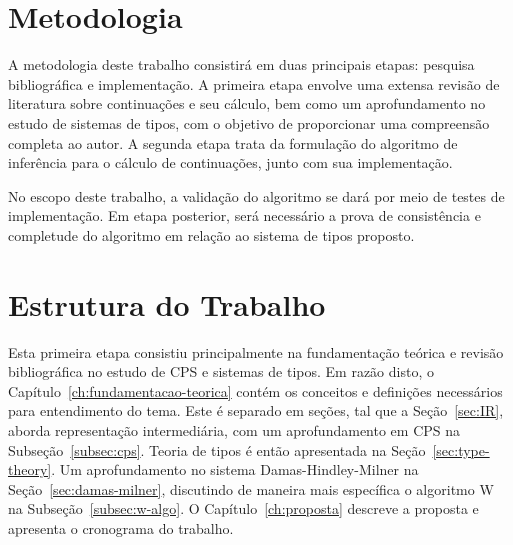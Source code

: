 \section{Metodologia}\label{sec:metodologia}

A metodologia deste trabalho consistirá em duas principais etapas: pesquisa bibliográfica e implementação.
A primeira etapa envolve uma extensa revisão de literatura sobre continuações e seu cálculo, bem como um aprofundamento no estudo de sistemas de tipos, com o objetivo de proporcionar uma compreensão completa ao autor.
A segunda etapa trata da formulação do algoritmo de inferência para o cálculo de continuações, junto com sua implementação.

No escopo deste trabalho, a validação do algoritmo se dará por meio de testes de implementação.
Em etapa posterior, será necessário a prova de consistência e completude do algoritmo em relação ao sistema de tipos proposto.

\section{Estrutura do Trabalho}\label{sec:estrutura-trabalho}

Esta primeira etapa consistiu principalmente na fundamentação teórica e revisão bibliográfica no estudo de CPS e sistemas de tipos.
Em razão disto, o Capítulo~\ref{ch:fundamentacao-teorica} contém os conceitos e definições necessários para entendimento do tema.
Este é separado em seções, tal que a Seção~\ref{sec:IR}, aborda representação intermediária, com um aprofundamento em CPS na Subseção~\ref{subsec:cps}.
Teoria de tipos é então apresentada na Seção~\ref{sec:type-theory}.
Um aprofundamento no sistema Damas-Hindley-Milner na Seção~\ref{sec:damas-milner}, discutindo de maneira mais específica o algoritmo W na Subseção~\ref{subsec:w-algo}.
O Capítulo~\ref{ch:proposta} descreve a proposta e apresenta o cronograma do trabalho.
